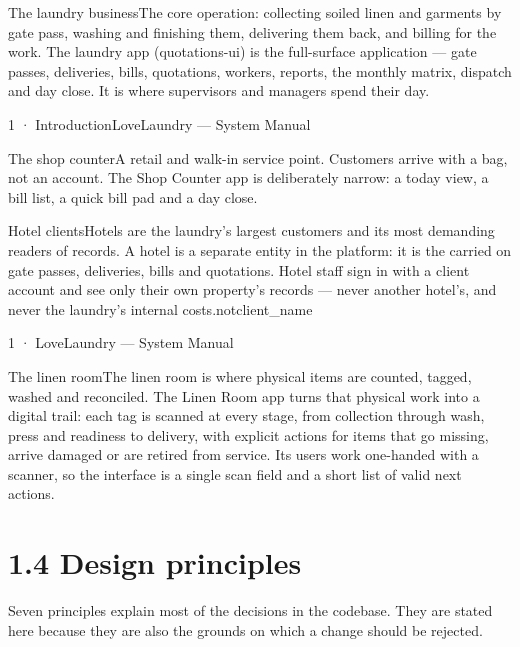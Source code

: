 \documentclass[11pt,a4paper,oneside]{book}
\begin{document}
The laundry businessThe core operation: collecting soiled linen and garments by gate pass, washing and finishing them, delivering them back, and billing for the work. The laundry app (quotations-ui) is the full-surface application — gate passes, deliveries, bills, quotations, workers, reports, the monthly matrix, dispatch and day close. It is where supervisors and managers spend their day.

1 · IntroductionLoveLaundry — System Manual

The shop counterA retail and walk-in service point. Customers arrive with a bag, not an account. The Shop Counter app is deliberately narrow: a today view, a bill list, a quick bill pad and a day close.

Hotel clientsHotels are the laundry's largest customers and its most demanding readers of records. A hotel is a separate entity in the platform: it is the carried on gate passes, deliveries, bills and quotations. Hotel staff sign in with a client account and see only their own property's records — never another hotel's, and never the laundry's internal costs.notclient\_name

1 · LoveLaundry — System Manual

The linen roomThe linen room is where physical items are counted, tagged, washed and reconciled. The Linen Room app turns that physical work into a digital trail: each tag is scanned at every stage, from collection through wash, press and readiness to delivery, with explicit actions for items that go missing, arrive damaged or are retired from service. Its users work one-handed with a scanner, so the interface is a single scan field and a short list of valid next actions.

\section{1.4 Design principles}
Seven principles explain most of the decisions in the codebase. They are stated here because they are also the grounds on which a change should be rejected.
\end{document}
